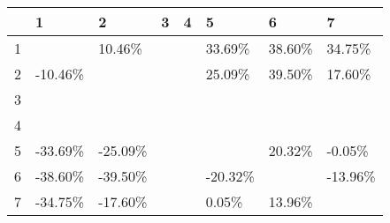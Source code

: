 \begin{table}[ht]
\centering
\begin{tabular}{rlllllll}
  \hline
 & 1 & 2 & 3 & 4 & 5 & 6 & 7 \\ 
  \hline
1 &  & 10.46\% &  &  & 33.69\% & 38.60\% & 34.75\% \\ 
  2 & -10.46\% &  &  &  & 25.09\% & 39.50\% & 17.60\% \\ 
  3 &  &  &  &  &  &  &  \\ 
  4 &  &  &  &  &  &  &  \\ 
  5 & -33.69\% & -25.09\% &  &  &  & 20.32\% & -0.05\% \\ 
  6 & -38.60\% & -39.50\% &  &  & -20.32\% &  & -13.96\% \\ 
  7 & -34.75\% & -17.60\% &  &  & 0.05\% & 13.96\% &  \\ 
   \hline
\end{tabular}
\end{table}
